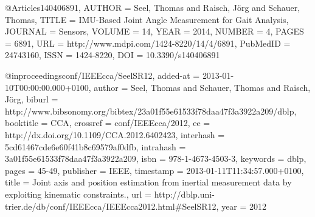 @Article{s140406891,
AUTHOR = {Seel, Thomas and Raisch, Jörg and Schauer, Thomas},
TITLE = {IMU-Based Joint Angle Measurement for Gait Analysis},
JOURNAL = {Sensors},
VOLUME = {14},
YEAR = {2014},
NUMBER = {4},
PAGES = {6891},
URL = {http://www.mdpi.com/1424-8220/14/4/6891},
PubMedID = {24743160},
ISSN = {1424-8220},
DOI = {10.3390/s140406891}
}

@inproceedings{conf/IEEEcca/SeelSR12,
  added-at = {2013-01-10T00:00:00.000+0100},
  author = {Seel, Thomas and Schauer, Thomas and Raisch, Jörg},
  biburl = {http://www.bibsonomy.org/bibtex/23a01f55e61533f78daa47f3a3922a209/dblp},
  booktitle = {CCA},
  crossref = {conf/IEEEcca/2012},
  ee = {http://dx.doi.org/10.1109/CCA.2012.6402423},
  interhash = {5cd61467cde6e60f41b8c69579af0dfb},
  intrahash = {3a01f55e61533f78daa47f3a3922a209},
  isbn = {978-1-4673-4503-3},
  keywords = {dblp},
  pages = {45-49},
  publisher = {IEEE},
  timestamp = {2013-01-11T11:34:57.000+0100},
  title = {Joint axis and position estimation from inertial measurement data by exploiting kinematic constraints.},
  url = {http://dblp.uni-trier.de/db/conf/IEEEcca/IEEEcca2012.html#SeelSR12},
  year = 2012
}

